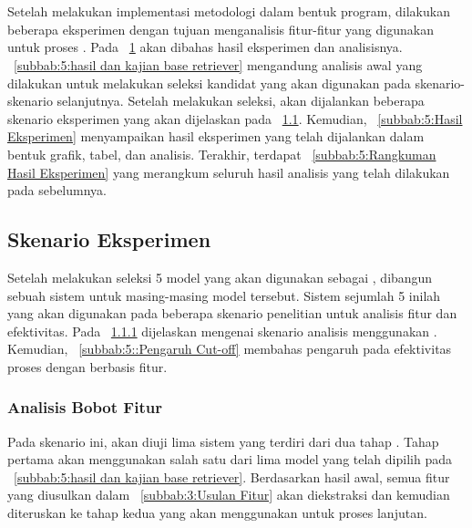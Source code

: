 \chapter{\babLima}
\label{bab:5}
Setelah melakukan implementasi metodologi dalam bentuk program, dilakukan beberapa eksperimen dengan tujuan menganalisis fitur-fitur yang digunakan untuk proses \reranking{}. Pada \bab{}~\ref{bab:5} akan dibahas hasil eksperimen dan analisisnya. \subbab{}~\ref{subbab:5:hasil dan kajian base retriever} mengandung analisis awal yang dilakukan untuk melakukan seleksi kandidat \base{} \retriever{} yang akan digunakan pada skenario-skenario selanjutnya. Setelah melakukan seleksi, akan dijalankan beberapa skenario eksperimen yang akan dijelaskan pada \subbab{}~\ref{subbab:5:Skenario Eksperimen}. Kemudian, \subbab{}~\ref{subbab:5:Hasil Eksperimen} menyampaikan hasil eksperimen yang telah dijalankan dalam bentuk grafik, tabel, dan analisis. Terakhir, terdapat \subbab{}~\ref{subbab:5:Rangkuman Hasil Eksperimen} yang merangkum seluruh hasil analisis yang telah dilakukan pada \subbab{} sebelumnya.





\section{Skenario Eksperimen}
\label{subbab:5:Skenario Eksperimen}
Setelah melakukan seleksi 5 model yang akan digunakan sebagai \base{} \retriever{}, dibangun sebuah sistem \cascaded{} \ir{} untuk masing-masing model tersebut. Sistem \ir{} sejumlah 5 inilah yang akan digunakan pada beberapa skenario penelitian untuk analisis fitur dan efektivitas. Pada \subbab{}~\ref{subbab:5::Analisis Bobot Fitur} dijelaskan mengenai skenario analisis \feature{} \importance{} menggunakan \fcv{}. Kemudian, \subbab{}~\ref{subbab:5::Pengaruh Cut-off} membahas pengaruh \cutoff{} pada efektivitas proses \reranking{} dengan \reranker{} berbasis fitur.





\subsection{Analisis Bobot Fitur}
\label{subbab:5::Analisis Bobot Fitur}
Pada skenario ini, akan diuji lima sistem \cascaded{} \ir{} yang terdiri dari dua tahap \ranking{}. Tahap pertama akan menggunakan salah satu dari lima model yang telah dipilih pada \subbab{}~\ref{subbab:5:hasil dan kajian base retriever}. Berdasarkan hasil \ranking{} awal, semua fitur yang diusulkan dalam \subbab{}~\ref{subbab:3:Usulan Fitur} akan diekstraksi dan kemudian diteruskan ke tahap kedua yang akan menggunakan \lambdamart{} untuk proses \ranking{} lanjutan.

